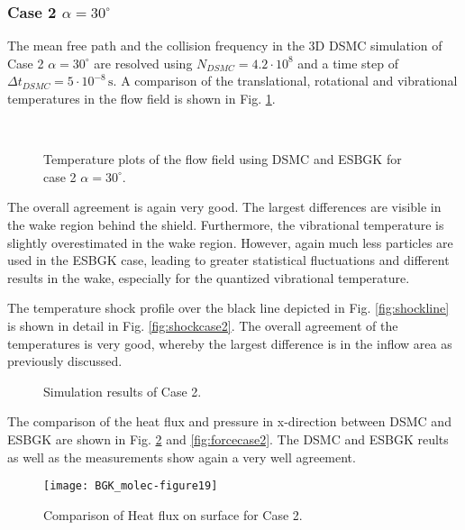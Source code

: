 \documentclass[aip,pof,amsmath,amssymb,preprint]{revtex4-1}
\begin{document}
\subsubsection*{Case 2 $\alpha=30^\circ$}
The mean free path and the collision frequency in the 3D DSMC simulation of Case 2 $\alpha=30^\circ$ are resolved using
$N_{DSMC}=4.2\cdot 10^8$ and a time step of $\Delta t_{DSMC}=5\cdot 10^{-8}\,\mathrm{s}$. 
A comparison of the translational, rotational and vibrational temperatures in the flow field is shown in Fig. \ref{fig:compcase2}.
\begin{figure}
\centering
{}\quad
{}\quad
{}\\
\quad
{}\quad
{}
\caption{Temperature plots of the flow field using DSMC and ESBGK for case 2 $\alpha=30^\circ$.\label{fig:compcase2}}
\end{figure}
The overall agreement is again very good. The largest differences are visible in the wake region behind the shield. Furthermore, the vibrational temperature is
slightly overestimated in the wake region. However, again much less particles are used in the ESBGK case, leading to greater statistical fluctuations and different results in the wake,
especially for the quantized vibrational temperature.

The temperature shock profile over the black line depicted in Fig. \ref{fig:shockline} is shown in detail in Fig. \ref{fig:shockcase2}. The overall agreement of the temperatures
is very good, whereby the largest difference is in the inflow area as previously discussed.
\begin{figure}
\centering
{}\quad
{}
\caption{Simulation results of Case 2.}
\end{figure}

The comparison of the heat flux and pressure in x-direction between DSMC and ESBGK are shown in Fig. \ref{fig:set1heatforceCase2} and \ref{fig:forcecase2}. 
The DSMC and ESBGK reults as well as the measurements show again a very well agreement.
\begin{figure}
\centering
\texttt{[image: BGK\_molec-figure19]}
\caption{Comparison of Heat flux on surface for Case 2.\label{fig:set1heatforceCase2}}
\end{figure}
\end{document}
